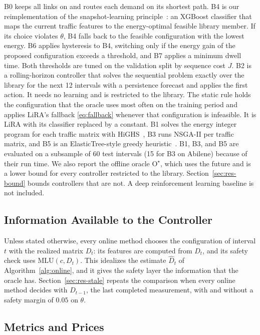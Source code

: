 \documentclass[preprint,12pt]{elsarticle}
\begin{document}
B0 keeps all links on and routes each demand on its shortest path. B4 is our reimplementation of the snapshot-learning principle~\cite{gomezdelahiz2025noms,gomezdelahiz2026tgcn}: an XGBoost classifier that maps the current traffic features to the energy-optimal feasible library member. If its choice violates $\theta$, B4 falls back to the feasible configuration with the lowest energy. B6 applies hysteresis to B4, switching only if the energy gain of the proposed configuration exceeds a threshold, and B7 applies a minimum dwell time. Both thresholds are tuned on the validation split by sequence cost $J$. B2 is a rolling-horizon controller that solves the sequential problem exactly over the library for the next 12 intervals with a persistence forecast and applies the first action. It needs no learning and is restricted to the library. The static rule holds the configuration that the oracle uses most often on the training period and applies LiRA's fallback \eqref{eq:fallback} whenever that configuration is infeasible. It is LiRA with its classifier replaced by a constant. B1 solves the energy integer program for each traffic matrix with HiGHS~\cite{huangfu2018highs}, B3 runs NSGA-II per traffic matrix, and B5 is an ElasticTree-style greedy heuristic~\cite{heller2010elastictree}. B1, B3, and B5 are evaluated on a subsample of 60 test intervals (15 for B3 on Abilene) because of their run time. We also report the offline oracle $\mathrm{O}^\star$, which uses the future and is a lower bound for every controller restricted to the library. Section~\ref{sec:res-bound} bounds controllers that are not. A deep reinforcement learning baseline is not included.

\subsection{Information Available to the Controller}\label{sec:protocol}

Unless stated otherwise, every online method chooses the configuration of interval $t$ with the realized matrix $D_t$: its features are computed from $D_t$, and its safety check uses $\mathrm{MLU}(c,D_t)$. This idealizes the estimate $\hat D_t$ of Algorithm~\ref{alg:online}, and it gives the safety layer the information that the oracle has. Section~\ref{sec:res-stale} repeats the comparison when every online method decides with $D_{t-1}$, the last completed measurement, with and without a safety margin of $0.05$ on $\theta$.

\subsection{Metrics and Prices}
\end{document}
